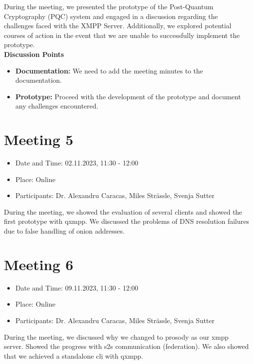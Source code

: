 \noindent During the meeting, we presented the prototype of the Post-Quantum Cryptography (PQC) system and engaged in a discussion regarding the challenges faced with the XMPP Server. Additionally, we explored potential courses of action in the event that we are unable to successfully implement the prototype.\\

\noindent\textbf{Discussion Points}
\begin{itemize}
    \item \textbf{Documentation:} We need to add the meeting minutes to the documentation.
    \item \textbf{Prototype:} Proceed with the development of the prototype and document any challenges encountered.
\end{itemize}

\section{Meeting 5}

\begin{itemize}
    \item Date and Time: 02.11.2023, 11:30 - 12:00
    \item Place: Online
    \item Participants: Dr. Alexandru Caracas, Miles Strässle, Svenja Sutter
\end{itemize}

\noindent During the meeting, we showed the evaluation of several clients and showed the first prototype with qxmpp. We discussed the problems of DNS resolution failures due to false handling of onion addresses.\\

\section{Meeting 6}

\begin{itemize}
    \item Date and Time: 09.11.2023, 11:30 - 12:00
    \item Place: Online
    \item Participants: Dr. Alexandru Caracas, Miles Strässle, Svenja Sutter
\end{itemize}

\noindent During the meeting, we discussed why we changed to prosody as our xmpp server. Showed the progress with s2s communication (federation). We also showed that we achieved a standalone cli with qxmpp.\\

